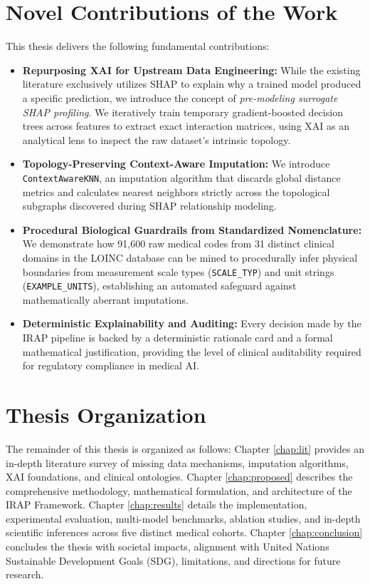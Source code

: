 \documentclass[MTech]{ugthesis}
\begin{document}
\section{Novel Contributions of the Work}
This thesis delivers the following fundamental contributions:
\begin{itemize}
    \item \textbf{Repurposing XAI for Upstream Data Engineering:} While the existing literature exclusively utilizes \ac{SHAP} to explain why a trained model produced a specific prediction, we introduce the concept of \textit{pre-modeling surrogate SHAP profiling}. We iteratively train temporary gradient-boosted decision trees across features to extract exact interaction matrices, using \ac{XAI} as an analytical lens to inspect the raw dataset's intrinsic topology.
    \item \textbf{Topology-Preserving Context-Aware Imputation:} We introduce \texttt{ContextAwareKNN}, an imputation algorithm that discards global distance metrics and calculates nearest neighbors strictly across the topological subgraphs discovered during \ac{SHAP} relationship modeling.
    \item \textbf{Procedural Biological Guardrails from Standardized Nomenclature:} We demonstrate how 91,600 raw medical codes from 31 distinct clinical domains in the \ac{LOINC} database can be mined to procedurally infer physical boundaries from measurement scale types (\texttt{SCALE\_TYP}) and unit strings (\texttt{EXAMPLE\_UNITS}), establishing an automated safeguard against mathematically aberrant imputations.
    \item \textbf{Deterministic Explainability and Auditing:} Every decision made by the \ac{IRAP} pipeline is backed by a deterministic rationale card and a formal mathematical justification, providing the level of clinical auditability required for regulatory compliance in medical \ac{AI}.
\end{itemize}

\section{Thesis Organization}
The remainder of this thesis is organized as follows: Chapter \ref{chap:lit} provides an in-depth literature survey of missing data mechanisms, imputation algorithms, \ac{XAI} foundations, and clinical ontologies. Chapter \ref{chap:proposed} describes the comprehensive methodology, mathematical formulation, and architecture of the \ac{IRAP} Framework. Chapter \ref{chap:results} details the implementation, experimental evaluation, multi-model benchmarks, ablation studies, and in-depth scientific inferences across five distinct medical cohorts. Chapter \ref{chap:conclusion} concludes the thesis with societal impacts, alignment with United Nations Sustainable Development Goals (\ac{SDG}), limitations, and directions for future research.
\end{document}
